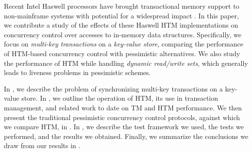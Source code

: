 Recent Intel Haswell processors have brought transactional memory support to
non-mainframe systems with potential for a widespread impact \citep{tsx-tools,lwn}. 
In this paper, we contribute a study
of the effects of these Haswell HTM implementations on concurrency control over 
accesses to
in-memory data structures. Specifically, we focus on \textit{multi-key
  transactions} on a \textit{key-value store}, comparing the performance of
HTM-based concurrency control with pessimistic alternatives. We also study the
performance of HTM while handling \textit{dynamic read/write sets}, which
generally leads to liveness problems in pessimistic schemes.

In , we describe the problem of synchronizing multi-key
transactions on a key-value store. In , we outline the operation of
HTM, its use in transaction management, and related work to date on TM and HTM
performance. We then present the traditional pessimistic concurrency control
protocols, against which we compare HTM, in  . In
, we describe the test framework we used, the tests we performed,
and the results we obtained. Finally, we summarize the conclusions we draw from
our results in .
